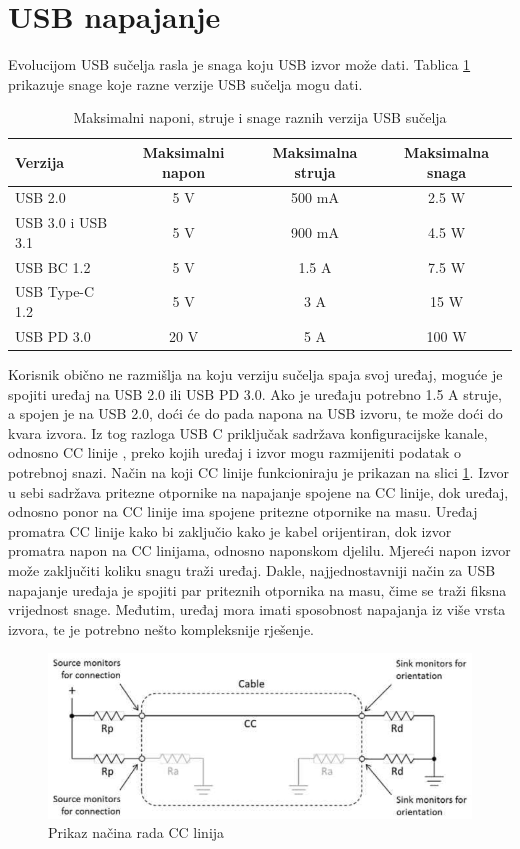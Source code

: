 \section{USB napajanje}

Evolucijom USB sučelja rasla je snaga koju USB izvor može dati. Tablica \ref{tab:USB} prikazuje snage koje razne verzije USB sučelja mogu dati.
\begin{table}[htbp]
    \centering
    \caption{Maksimalni naponi, struje i snage raznih verzija USB sučelja \cite{ti:usb}}
    \begin{tabular}{|l|c|c|c|} \hline
    Verzija & Maksimalni napon & Maksimalna struja & Maksimalna snaga \\
    \hline
    USB 2.0 & 5 V & 500 mA & 2.5 W \\
    \hline
    USB 3.0 i USB 3.1 & 5 V & 900 mA & 4.5 W \\
    \hline
    USB BC 1.2 & 5 V & 1.5 A & 7.5 W \\
    \hline
    USB Type-C 1.2 & 5 V & 3 A & 15 W \\
    \hline
    USB PD 3.0 & 20 V & 5 A & 100 W \\
    \hline
    \end{tabular}
    \label{tab:USB}
\end{table}
Korisnik obično ne razmišlja na koju verziju sučelja spaja svoj uređaj, moguće je spojiti uređaj na USB 2.0 ili USB PD 3.0. Ako je uređaju potrebno 1.5 A struje, a spojen je na USB 2.0, doći će do pada napona na USB izvoru, te može doći do kvara izvora. Iz tog razloga USB C priključak sadržava konfiguracijske kanale, odnosno CC linije , preko kojih uređaj i izvor mogu razmijeniti podatak o potrebnoj snazi. Način na koji CC linije funkcioniraju je prikazan na slici \ref{slk:USB_CC_LINES}. Izvor u sebi sadržava pritezne otpornike na napajanje spojene na CC linije, dok uređaj, odnosno ponor na CC linije ima spojene pritezne otpornike na masu. Uređaj promatra CC linije kako bi zaključio kako je kabel orijentiran, dok izvor promatra napon na CC linijama, odnosno naponskom djelilu. Mjereći napon izvor može zaključiti koliku snagu traži uređaj. Dakle, najjednostavniji način za USB napajanje uređaja je spojiti par priteznih otpornika na masu, čime se traži fiksna vrijednost snage. Međutim, uređaj mora imati sposobnost napajanja iz više vrsta izvora, te je potrebno nešto kompleksnije rješenje.
\begin{figure}[htb]
    \centering
    \includegraphics[width=10 cm]{Figures/USB_CC_LINES.png}
    \caption{Prikaz načina rada CC linija \cite{ti:usb}}
    \label{slk:USB_CC_LINES}
\end{figure}

